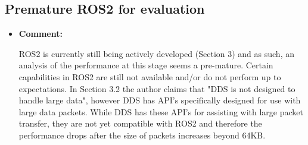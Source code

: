 \documentclass{article}
\begin{document}
\subsection{Premature ROS2 for evaluation}
\begin{itemize}

\item \begin{flushleft}
    \textbf{Comment:}
  \end{flushleft}
  ROS2 is currently still being actively developed (Section 3) and as such, an analysis of the performance at this stage seems a pre-mature. Certain capabilities in ROS2 are still not available and/or do not perform up to expectations. In Section 3.2 the author claims that "DDS is not designed to handle large data", however DDS has API's specifically designed for use with large data packets. While DDS has these API’s for assisting with large packet transfer, they are not yet compatible with ROS2 and therefore the performance drops after the size of packets increases beyond 64KB.


\end{itemize}
\end{document}
